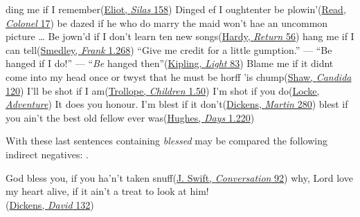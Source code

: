 \ex
ding me if I remember\hfill(\href{https://archive.org/details/silasmarnerbygeo00elio/page/110/mode/2up?q=\%22ding+me\%22&view=theater}{Eliot, \textit{Silas} 158})
\ex
Dinged ef I oughtenter be plowin'\hfill(\href{https://archive.org/details/kentuckycolonel00readrich/page/14/mode/2up?q=\%22Dinged+ef+I+oughtenter+be+plowin\%22&view=theater}{Read, \textit{Colonel} 17})
\ex
be dazed if he who do marry the maid won't hae an uncommon picture {\dots} Be jown'd if I don't learn ten new songs\hfill(\href{https://archive.org/details/returnofthenativ00harduoft/page/44/mode/2up?q=\%22dazed+if+he+who+do+marry\%22&view=theater}{Hardy, \textit{Return} 56})
\ex
hang me if I can tell\hfill(\href{https://archive.org/details/frankfairleghors00smed/page/198/mode/2up?q=\%22hang+me+if+I+can+tell\%22&view=theater}{Smedley, \textit{Frank} 1.268})
\ex
``Give me credit for a little gumption.'' --- ``Be hanged if I do!'' --- ``\textit{Be} hanged then''\hfill(\href{https://archive.org/details/lightthatfailed01kipluoft/page/98/mode/2up?q=\%22Be+hanged+then\%22&view=theater}{Kipling, \textit{Light} 83}) %
\ex
Blame me if it didnt come into my head once or twyst that he must be horff 'is chump\hfill(\href{https://archive.org/details/candidamystery02shawuoft/page/120/mode/2up?q=\%22that+he+must+be+horff+%E2%80%99is+chump\%22&view=theater}{Shaw, \textit{Candida} 120})
\ex
I'll be shot if I am\hfill(\href{https://archive.org/details/dukeschildren01trolgoog/page/n60/mode/2up?q=\%22I%27ll+be+shot+if+I+am\%22&view=theater}{Trollope, \textit{Children} 1.50})
\ex
I'm shot if you do\hfill(\href{https://archive.org/details/joyousadventures00lockuoft/page/94/mode/2up?q=\%22I%27m+shot+if+you+do\%22&view=theater}{Locke, \textit{Adventure}})
\ex
It does you honour. I'm blest if it don't\hfill(\href{https://archive.org/details/Chuzzlewit11/page/n33/mode/2up?q=\%22I%E2%80%99m+blest+if+it+don%E2%80%99t\%22&view=theater}{Dickens, \textit{Martin} 280})
\ex
blest if you ain't the best old fellow ever was\hfill(\href{https://archive.org/details/tombrownsschoold00hugh4/page/226/mode/2up?q=\%22blest+if+you+ain%27t+the+best+old+fellow+ever+was\%22&view=theater}{Hughes, \textit{Days} 1.220})
\z
\z

With these last sentences containing \textit{blessed} may be compared the following indirect negatives: .

\ea \label{ex:04-72}
\ea
God bless you, if you ha'n't taken snuff\hfill(\href{https://archive.org/details/cu31924013200898/page/n127/mode/2up?q=\%22if+you+ha%27n%27t+taken+snuff\%22&view=theater}{J. Swift, \textit{Conversation} 92})
\ex why, Lord love my heart alive, if it ain't a treat to look at him!\\\hfill(\href{https://archive.org/details/personalhistory05dickgoog/page/n63/mode/2up?q=\%22Lord+love+my+heart\%22&view=theater}{Dickens, \textit{David} 132})
\z
\z

